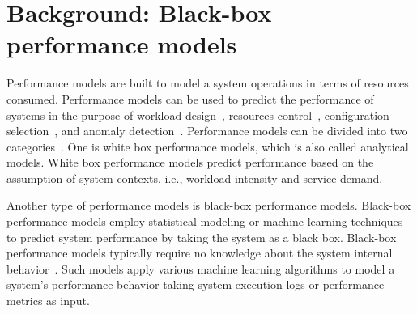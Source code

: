 \section{Background: Black-box performance models} \label{sec:background}

Performance models are built to model a system operations in terms of resources consumed. Performance models can be used to predict the performance of systems in the purpose of workload design~\citep{DBLP:journals/tse/KrishnamurthyRM06,DBLP:conf/fast/YadwadkarBGNS10,DBLP:journals/ase/SyerSJH17}, resources control~\citep{DBLP:conf/cnsm/GongGW10,DBLP:conf/sosp/CortezBMRFB17}, configuration selection~\citep{DBLP:conf/kbse/GuoCASW13,DBLP:conf/wosp/ValovPGFC17,DBLP:journals/ese/GuoYSASVCWY18}, and anomaly detection~\citep{DBLP:journals/csur/IbidunmoyeHE15,DBLP:conf/issre/FarshchiSWG15,DBLP:journals/stvr/GhaithWPJOM16}. Performance models can be divided into two categories~\citep{DBLP:conf/wosp/DidonaQRT15}. One is white box performance models, which is also called analytical models. White box performance models predict performance based on the assumption of system contexts, i.e., workload intensity and service demand.

Another type of performance models is black-box performance models. Black-box performance models employ statistical modeling or machine learning techniques to predict system performance by taking the system as a black box.
Black-box performance models typically require no knowledge about the system internal behavior~\citep{DBLP:conf/wosp/DidonaQRT15,DBLP:conf/icst/GaoJBL16}. Such models apply various machine learning algorithms to model a system's performance behavior taking system execution logs or performance metrics as input. 

